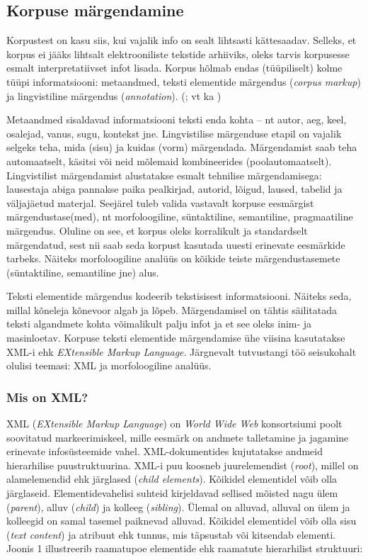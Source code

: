 \documentclass[12pt]{article}
\begin{document}
\subsection{Korpuse märgendamine}

Korpustest on kasu siis, kui vajalik info on sealt lihtsasti kättesaadav. Selleks, et korpus ei jääks lihtsalt elektrooniliste tekstide arhiiviks, oleks tarvis korpusesse esmalt interpretatiivset infot lisada. \citep[12]{KR} Korpus hõlmab endas (tüüpiliselt) kolme tüüpi informatsiooni: metaandmed, teksti elementide märgendus (\emph{corpus markup}) ja lingvistiline märgendus (\emph{annotation}). (\citealp[30]{KORPUS}; vt ka \citealp{BURNARD})

Metaandmed sisaldavad informatsiooni teksti enda kohta -- nt autor, aeg, keel, osalejad, vanus, sugu, kontekst jne. Lingvistilise märgenduse etapil on vajalik selgeks teha, mida (sisu) ja kuidas (vorm) märgendada. Märgendamist saab teha automaatselt, käsitsi või neid mõlemaid kombineerides (poolautomaatselt). Lingvistilist märgendamist alustatakse esmalt tehnilise märgendamisega: lausestaja abiga pannakse paika pealkirjad, autorid, lõigud, laused, tabelid ja väljajäetud materjal. Seejärel tuleb valida vastavalt korpuse eesmärgist märgendustase(med), nt morfoloogiline, süntaktiline, semantiline, pragmaatiline märgendus. Oluline on see, et korpus oleks korralikult ja standardselt märgendatud, sest nii saab seda korpust kasutada uuesti erinevate eesmärkide tarbeks. Näiteks morfoloogiline analüüs on kõikide teiste märgendustasemete (süntaktiline, semantiline jne) alus. \citep[12--14]{KR}

Teksti elementide märgendus kodeerib tekstisisest informatsiooni. Näiteks seda, millal kõneleja kõnevoor algab ja lõpeb. Märgendamisel on tähtis säilitatada teksti algandmete kohta võimalikult palju infot ja et see oleks inim- ja masinloetav. Korpuse teksti elementide märgendamise ühe viisina kasutatakse XML-i ehk \emph{EXtensible Markup Language}. \citep[29--30]{KORPUS} Järgnevalt tutvustangi töö seisukohalt olulisi teemasi: XML ja morfoloogiline analüüs.


\subsubsection{Mis on XML?}

XML (\emph{EXtensible Markup Language}) on \emph{World Wide Web} konsortsiumi poolt soovitatud markeerimiskeel, mille eesmärk on andmete talletamine ja jagamine erinevate infosüsteemide vahel. XML-dokumentides kujutatakse andmeid hierarhilise puustruktuurina. XML-i puu koosneb juurelemendist (\emph{root}), millel on alamelemendid ehk järglased (\emph{child elements}). Kõikidel elementidel võib olla järglaseid. Elementidevahelisi suhteid kirjeldavad sellised mõisted nagu ülem (\emph{parent}), alluv (\emph{child}) ja kolleeg (\emph{sibling}). Ülemal on alluvad, alluval on ülem ja kolleegid on samal tasemel paiknevad alluvad. Kõikidel elementidel võib olla sisu (\emph{text content}) ja atribuut ehk tunnus, mis täpsustab või kitsendab elementi. \citep{XML} Joonis 1 illustreerib raamatupoe elementide ehk raamatute hierarhilist struktuuri:
\end{document}
